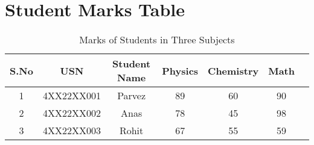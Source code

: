\documentclass[a4paper,12pt]{article}
\begin{document}
\section*{Student Marks Table}

\begin{table}[h!]
\centering
\caption{Marks of Students in Three Subjects}
\begin{tabular}{|c|c|c|c|c|c|c|}
\hline
\textbf{S.No} & \textbf{USN} & \textbf{Student Name} & \textbf{Physics} & \textbf{Chemistry} & \textbf{Math} \\
\hline
1 & 4XX22XX001 & Parvez & 89 & 60 & 90 \\
2 & 4XX22XX002 & Anas & 78 & 45 & 98 \\
3 & 4XX22XX003 & Rohit & 67 & 55 & 59 \\
\hline
\end{tabular}
\end{table}
\end{document}
